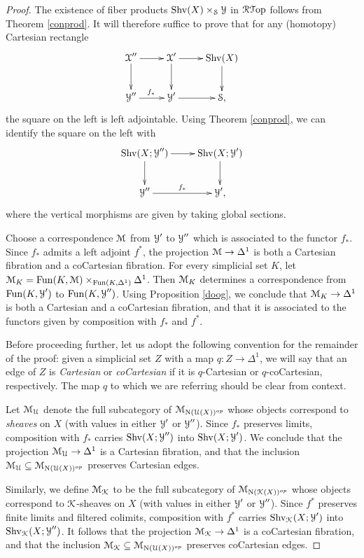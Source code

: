 \begin{proof}
The existence of fiber products $\operatorname{Shv}(X) \times_{\operatorname{\mathcal{S}}} \operatorname{\mathcal{Y}}$ in
$\operatorname{\mathcal{R}{\mathcal T}op}$ follows from Theorem \ref{conprod}. It will therefore suffice to prove that for any (homotopy) Cartesian rectangle
$$ \xymatrix{ \calX'' \ar[r] \ar[d] & \calX' \ar[r] \ar[d] & \Shv(X) \ar[d] \\
\calY'' \ar[r]^{f_{\ast}} & \calY' \ar[r] & \SSet,}$$
the square on the left is left adjointable. Using Theorem \ref{conprod}, we can
identify the square on the left with
$$ \xymatrix{ \Shv(X; \calY'') \ar[r] \ar[d] & \Shv(X; \calY') \ar[d] \\
\calY'' \ar[r]^{f_{\ast}} & \calY', }$$ where the vertical morphisms are given by taking global sections.

Choose a correspondence $\operatorname{\mathcal{M}}$ from $\operatorname{\mathcal{Y}}'$ to $\operatorname{\mathcal{Y}}''$ which is associated to the functor $f_{\ast}$. Since $f_{\ast}$ admits a left adjoint $f^{\ast}$, the projection $\operatorname{\mathcal{M}} \rightarrow \Delta^1$ is both a Cartesian fibration and a coCartesian fibration. For every simplicial
set $K$, let $\operatorname{\mathcal{M}}_{K} = \operatorname{Fun}(K,\operatorname{\mathcal{M}}) \times_{ \operatorname{Fun}(K,\Delta^1) } \Delta^1$. Then $\operatorname{\mathcal{M}}_{K}$ determines a correspondence from $\operatorname{Fun}(K,\operatorname{\mathcal{Y}}')$ to $\operatorname{Fun}(K,\operatorname{\mathcal{Y}}'')$. Using Proposition \ref{doog}, we
conclude that $\operatorname{\mathcal{M}}_{K} \rightarrow \Delta^1$ is both a Cartesian and a coCartesian fibration,
and that it is associated to the functors given by composition with $f_{\ast}$ and $f^{\ast}$.

Before proceeding further, let us adopt the following convention for the remainder of the proof:
given a simplicial set $Z$ with a map $q: Z \rightarrow \Delta^1$, we will say that an edge
of $Z$ is {\it Cartesian} or {\it coCartesian} if it is $q$-Cartesian or $q$-coCartesian, respectively.
The map $q$ to which we are referring should be clear from context.

Let $\operatorname{\mathcal{M}}_{\operatorname{\mathcal{U}}}$ denote the full subcategory of $\operatorname{\mathcal{M}}_{ \operatorname{N}(\operatorname{\mathcal{U}}(X))^{op}}$ whose objects
correspond to {\em sheaves} on $X$ (with values in either $\operatorname{\mathcal{Y}}'$ or $\operatorname{\mathcal{Y}}''$). Since
$f_{\ast}$ preserves limits, composition with $f_{\ast}$ carries $\operatorname{Shv}(X; \operatorname{\mathcal{Y}}'')$ into
$\operatorname{Shv}(X; \operatorname{\mathcal{Y}}')$. We conclude that the projection $\operatorname{\mathcal{M}}_{\operatorname{\mathcal{U}}} \rightarrow \Delta^1$
is a Cartesian fibration, and that the inclusion $\operatorname{\mathcal{M}}_{\operatorname{\mathcal{U}}} \subseteq \operatorname{\mathcal{M}}_{ \operatorname{N} (\operatorname{\mathcal{U}}(X))^{op}}$
preserves Cartesian edges.

Similarly, we define $\operatorname{\mathcal{M}}_{\operatorname{\mathcal{K}}}$ to be the full subcategory of $\operatorname{\mathcal{M}}_{ \operatorname{N}(\operatorname{\mathcal{K}}(X))^{op} }$
whose objects correspond to $\operatorname{\mathcal{K}}$-sheaves on $X$ (with values in either $\operatorname{\mathcal{Y}}'$ or
$\operatorname{\mathcal{Y}}''$). Since $f^{\ast}$ preserves finite limits and filtered colimits, composition with $f^{\ast}$ carries $\operatorname{Shv}_{\operatorname{\mathcal{K}}}(X; \operatorname{\mathcal{Y}}')$ into $\operatorname{Shv}_{\operatorname{\mathcal{K}}}(X; \operatorname{\mathcal{Y}}'')$. It follows that the projection
$\operatorname{\mathcal{M}}_{\operatorname{\mathcal{K}}} \rightarrow \Delta^1$ is a coCartesian fibration, and that the inclusion
$\operatorname{\mathcal{M}}_{\operatorname{\mathcal{K}}} \subseteq \operatorname{\mathcal{M}}_{ \operatorname{N}(\operatorname{\mathcal{U}}(X))^{op}}$ preserves coCartesian edges.


\end{proof}
